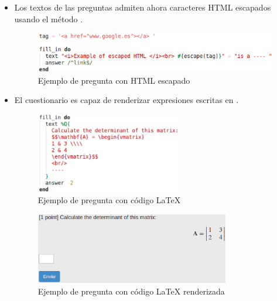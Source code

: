 \begin{itemize}
  \item Los textos de las preguntas admiten ahora caracteres HTML escapados usando el m\'etodo .
  \begin{figure}[!th]
  \begin{center}
  \includegraphics[width=1\textwidth]{images/tag.eps}
  \caption{Ejemplo de pregunta con HTML escapado}
  \label{fig:tag}
  \end{center}
  \end{figure}
  \newpage
  
  \item El cuestionario es capaz de renderizar expresiones escritas en .
  \begin{figure}[H]
  \begin{center}
  \includegraphics[width=0.6\textwidth]{images/latex.eps}
  \caption{Ejemplo de pregunta con c\'odigo LaTeX}
  \label{fig:latex}
  \end{center}
  \end{figure}
  
  \begin{figure}[H]
  \begin{center}
  \includegraphics[width=0.8\textwidth]{images/latex2.eps}
  \caption{Ejemplo de pregunta con c\'odigo LaTeX renderizada}
  \label{fig:latex2}
  \end{center}
  \end{figure}
  \newpage
  

\end{itemize}
